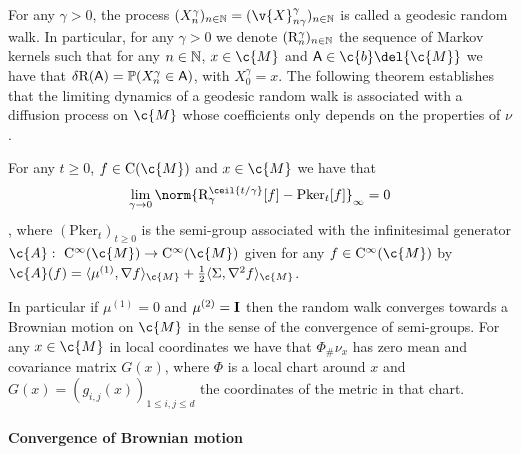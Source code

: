 For any \(\gamma > 0\), the process \((X_n^\gamma)_{n \in \N} = (\v{X}_{n \gamma}^\gamma)_{n \in \N}\) is called a geodesic random walk.
In particular, for any \(\gamma>0\) we denote \((\mathrm{R}_n^{\gamma})_{n \in \mathbb{N}}\) the sequence of Markov kernels such that for any \(n \in \mathbb{N}\), \(x \in \c{M}\) and \(\mathsf{A} \in \c{b}\del{\c{M}}\) we have that \(\delta \mathrm{R}(\mathsf{A}) = \bb{P}(X_n^\gamma \in \mathsf{A})\), with \(X_0^\gamma = x\).
The following theorem establishes that the limiting dynamics of a geodesic random walk is associated with a diffusion process on \(\c{M}\) whose coefficients only depends on the properties of \(\nu\) \cite[see][Theorem 2.1]{jorgensen1975central}.

\begin{theorem}
	\label{thm:jorgensen_appendix}
	For any \(t \geq 0\), \(f \in \mathrm{C}(\c{M})\) and \(x \in \c{M}\) we have that \[\lim_{\gamma \to 0} \norm{ \mathrm{R}_{\gamma}^{\ceil{t/\gamma}}[f] - \mathrm{Pker}_t[f]}_{\infty} = 0\], where \((\mathrm{Pker}_t)_{t \geq 0}\) is the semi-group associated with the infinitesimal generator \(\c{A}: \ \mathrm{C}^\infty(\c{M}) \to \mathrm{C}^\infty(\c{M})\) given for any \(f \in \mathrm{C}^\infty(\c{M})\) by \(\c{A}(f) = \langle \mu^{(1)}, \nabla f \rangle_{\c{M}} + \tfrac{1}{2} \langle \Sigma, \nabla^2f \rangle_{\c{M}}\).
\end{theorem}

In particular if \(\mu^{(1)} = 0\) and \(\mu^{(2)} = \m{I}\) then the random walk converges towards a Brownian motion on \(\c{M}\) in the sense of the convergence of semi-groups.
For any \(x \in \c{M}\) in local coordinates we have that \(\Phi_\# \nu_x\) has zero mean and covariance matrix \(G(x)\), where \(\Phi\) is a local chart around \(x\) and \(G(x) = (g_{i,j}(x))_{1 \leq i,j \leq d}\) the coordinates of the metric in that chart.

\paragraph{Convergence of Brownian motion}

